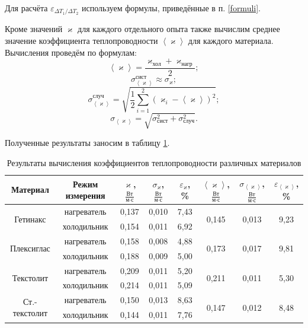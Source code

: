 \documentclass[a4paper,12pt]{article} %
\begin{document}
Для расчёта $ \varepsilon_{\Delta T_1/\Delta T_2} $ используем формулы, приведённые в п. \ref{formuli}.

Кроме значений $ \varkappa $ для каждого отдельного опыта также вычислим среднее значение коэффициента теплопроводности $ \left<\varkappa\right> $ для каждого материала. Вычисления проведём по формулам: \[ \left< \varkappa \right> = \frac{\varkappa_\text{хол}+\varkappa_\text{нагр}}{2}; \] 
\[ \sigma_{\left<\varkappa\right>}^{\text{сист}} \approx \sigma_\varkappa; \]
\[ \sigma_{\left<\varkappa\right>}^{\text{случ}} = \sqrt{\frac{1}{2}\sum_{i=1}^{2}\left(\varkappa_i-\left<\varkappa\right>\right)^2}; \]
\[ \sigma_{\left<\varkappa\right>} = \sqrt{\sigma^2_{\text{сист}}+\sigma^2_{\text{случ}}}. \]

Полученные результаты заносим в таблицу \ref{tab:result2}.

\begin{table}[H]
	\centering
	\begin{tabular}{|c|c|c|c|c|c|c|c|}
		\hline
		Материал                       & Режим измерения &$ \varkappa $, $ \frac{\text{Вт}}{\text{м} \cdot \text{с}} $    & $ \sigma_\varkappa $, $ \frac{\text{Вт}}{\text{м} \cdot \text{с}} $ & $ \varepsilon_\varkappa $, \% & $ \left<\varkappa\right> $, $ \frac{\text{Вт}}{\text{м} \cdot \text{с}} $                  & $ \sigma_{\left<\varkappa\right>} $, $ \frac{\text{Вт}}{\text{м} \cdot \text{с}} $            & $ \varepsilon_{\left<\varkappa\right>} $, \%           \\ \hline
		\multirow{2}{*}{Гетинакс}      & нагреватель     & 0,137 & 0,010    & 7,43     & \multirow{2}{*}{0,145} & \multirow{2}{*}{0,013} & \multirow{2}{*}{9,23} \\ \cline{2-5}
		& холодильник & 0,154 & 0,011 & 6,92 &  &  &  \\ \hline
		\multirow{2}{*}{Плексиглас}    & нагреватель     & 0,158 & 0,008    & 4,88     & \multirow{2}{*}{0,173} & \multirow{2}{*}{0,017} & \multirow{2}{*}{9,81} \\ \cline{2-5}
		& холодильник & 0,188 & 0,009 & 5,00 &  &  &  \\ \hline
		\multirow{2}{*}{Текстолит}     & нагреватель     & 0,209 & 0,011    & 5,20     & \multirow{2}{*}{0,211} & \multirow{2}{*}{0,011} & \multirow{2}{*}{5,30} \\ \cline{2-5}
		& холодильник & 0,214 & 0,011 & 5,09 &  &  &  \\ \hline
		\multirow{2}{*}{Ст.-текстолит} & нагреватель     & 0,150 & 0,013    & 8,63     & \multirow{2}{*}{0,147} & \multirow{2}{*}{0,012} & \multirow{2}{*}{8,48} \\ \cline{2-5}
		& холодильник & 0,144 & 0,011 & 7,76 &  &  &  \\ \hline
	\end{tabular}
	\caption{Результаты вычисления коэффициентов теплопроводности различных материалов}
	\label{tab:result2}
\end{table}
\end{document}
